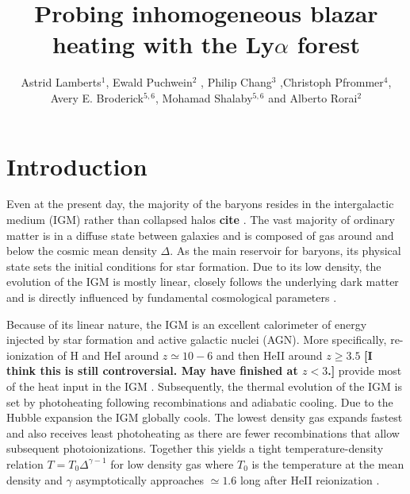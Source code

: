 \documentclass[numberedappendix]{emulateapj}
\newcommand\ALc[1]{{\color{red} \bf #1}} %
\newcommand\Ec[1]{{\color{magenta} \bf #1}} %
\begin{document}
\title{Probing inhomogeneous blazar heating with the Ly$\alpha$ forest}
\author{Astrid Lamberts$^1$,  Ewald Puchwein$^2$ , Philip Chang$^3$ ,Christoph Pfrommer$^4$, Avery E. Broderick$^{5,6}$,  Mohamad Shalaby$^{5,6}$ and Alberto Rorai$^2$}
\begin{abstract}

\end{abstract}
\keywords{}
\section{Introduction}

Even at the present day, the majority of the baryons resides in the intergalactic medium (IGM) rather than collapsed halos \ALc{cite} \citep{2012ApJ...759...23S}. The vast majority of ordinary matter is in a diffuse  state  between galaxies and is composed of gas around  and below the cosmic mean density $\Delta$\citep[see][for a recent review]{2016ARA&A..54..313M}. As the main reservoir for baryons,  its physical state sets the initial conditions for star formation. Due to its low density, the evolution of the IGM is mostly linear, closely follows the underlying dark matter and is directly influenced by fundamental cosmological parameters \citep{2013A&A...559A..85P,2013JCAP...04..026S,2015JCAP...11..011P}.  

Because of its linear nature, the IGM is an excellent calorimeter of energy injected by star formation and active galactic nuclei (AGN). More specifically, re-ionization of H and HeI around $z\simeq 10-6$ \citep{2006ARA&A..44..415F} and then HeII around $z\geqslant 3.5$ \Ec{[I think this is still controversial. May have finished at $z<3$.]} provide most of the heat input in the IGM \citep{2009ApJ...694..842M,2011ApJ...733L..24W}. Subsequently, the thermal evolution of the IGM is set by photoheating following recombinations and adiabatic cooling. Due to the Hubble expansion the IGM globally cools. The lowest density gas expands fastest and also receives least photoheating as there are fewer recombinations that allow subsequent photoionizations. Together this yields a tight temperature-density relation $T=T_0 \Delta ^{\gamma-1}$ for low density gas where $T_0$ is the temperature at the mean density and $\gamma$ asymptotically approaches $\simeq 1.6$  long after HeII reionization \citep{1997MNRAS.292...27H,2015MNRAS.450.4081P,2016MNRAS.456...47M}. 
\end{document}

